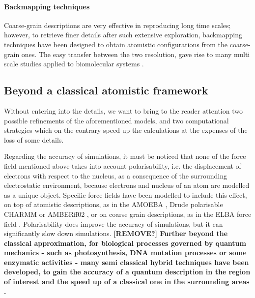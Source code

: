 \paragraph{Backmapping techniques} Coarse-grain descriptions are very effective in reproducing long time scales; however, to retrieve finer details after such extensive exploration, backmapping techniques have been designed to obtain atomistic configurations from the coarse-grain ones. The easy transfer between the two resolution, gave rise to many multi scale studies applied to biomolecular systems \cite{Lee2012}.


\subsection{Beyond a classical atomistic framework} 

Without entering into the details, we want to bring to the reader attention two possible refinements of the aforementioned models, and two computational strategies which on the contrary speed up the calculations at the expenses of the loss of some details.

Regarding the accuracy of simulations, it must be noticed that none of the force field mentioned above takes into account polarisability, i.e. the displacement of electrons with respect to the nucleus, as a consequence of the surrounding electrostatic environment, because electrons and nucleus of an atom are modelled as a unique object. Specific force fields have been modelled to include this effect, on top of atomistic descriptions, as in the AMOEBA \cite{Ren2003,Ponder2010}, Drude polarisable CHARMM \cite{Anisimov2004} or AMBERff02 \cite{Cieplak2001}, or on coarse grain descriptions, as in the ELBA force field \cite{Orsi2011}. Polarisability does improve the accuracy of simulations, but it can significantly slow down simulations.
%
\textbf{[REMOVE?] Further beyond the classical approximation, for biological processes governed by quantum mechanics - such as photosynthesis, DNA mutation processes or some enzymatic activities - many semi classical hybrid techniques have been developed, to gain the accuracy of a quantum description in the region of interest and the speed up of a classical one in the surrounding areas \cite{Ahmadi2018}.}

